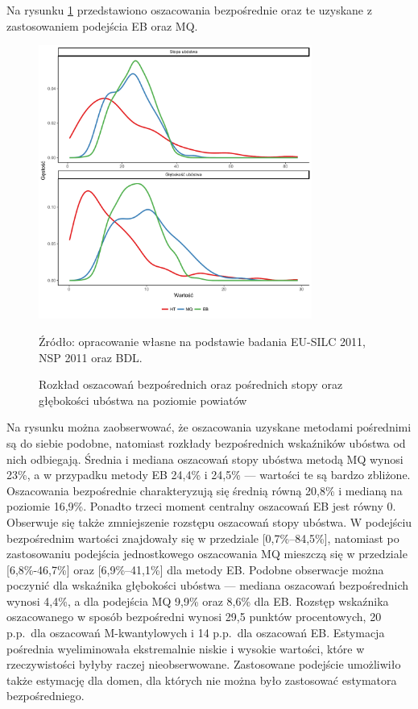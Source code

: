 Na rysunku \ref{fig:eb_mq_lvl1} przedstawiono oszacowania bezpośrednie oraz te uzyskane z zastosowaniem podejścia EB oraz MQ.

\begin{figure}[htp]
\centering
\includegraphics[width=0.8\textwidth]{04_wykresy/eb_mq_lvl1-1.pdf}
\caption{Rozkład oszacowań bezpośrednich oraz pośrednich stopy oraz głębokości ubóstwa na poziomie powiatów}
\small{Źródło: opracowanie własne na podstawie badania EU-SILC 2011, NSP 2011 oraz BDL.}
\label{fig:eb_mq_lvl1}
\end{figure}


Na rysunku można zaobserwować, że oszacowania uzyskane metodami pośrednimi są do siebie podobne, natomiast rozkłady bezpośrednich wskaźników ubóstwa od nich odbiegają. Średnia i mediana oszacowań stopy ubóstwa metodą MQ wynosi 23\%, a w przypadku metody EB 24,4\% i 24,5\% --- wartości te są bardzo zbliżone. Oszacowania bezpośrednie charakteryzują się średnią równą 20,8\% i medianą na poziomie 16,9\%. Ponadto trzeci moment centralny oszacowań EB jest równy 0. Obserwuje się także zmniejszenie rozstępu oszacowań stopy ubóstwa. W podejściu bezpośrednim wartości znajdowały się w przedziale {[}0,7\%--84,5\%{]}, natomiast po zastosowaniu podejścia jednostkowego oszacowania MQ mieszczą się w przedziale {[}6,8\%-46,7\%{]} oraz {[}6,9\%--41,1\%{]} dla metody EB. Podobne obserwacje można poczynić dla wskaźnika głębokości ubóstwa --- mediana oszacowań bezpośrednich wynosi 4,4\%, a dla podejścia MQ 9,9\% oraz 8,6\% dla EB. Rozstęp wskaźnika oszacowanego w sposób bezpośredni wynosi 29,5 punktów procentowych, 20 p.p.~dla oszacowań M-kwantylowych i 14 p.p.~dla oszacowań EB. Estymacja pośrednia wyeliminowała ekstremalnie niskie i wysokie wartości, które w rzeczywistości byłyby raczej nieobserwowane. Zastosowane podejście umożliwiło także estymację dla domen, dla których nie można było zastosować estymatora bezpośredniego.

